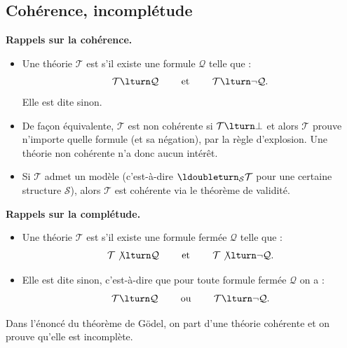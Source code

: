 \documentclass[11pt,class=report,crop=false]{standalone}
\begin{document}
\subsection{Cohérence, incomplétude}

\textbf{Rappels sur la cohérence.}

\begin{itemize}
    
    \item Une théorie $\mathcal{T}$ est  s'il existe une formule $\mathcal{Q}$ telle que :
\[
\mathcal{T} \lturn \mathcal{Q} \qquad \text{ et } \qquad \mathcal{T} \lturn \lnot \mathcal{Q}.
\]
Elle est dite  sinon.

    \item De façon équivalente, $\mathcal{T}$ est non cohérente si $\mathcal{T} \lturn \bot$ et alors $\mathcal{T}$ prouve n'importe quelle formule (et sa négation), par la règle d'explosion.
Une théorie non cohérente n'a donc aucun intérêt.

    \item Si $\mathcal{T}$ admet un modèle (c'est-à-dire $\ldoubleturn_\mathcal{S} \mathcal{T}$ pour une certaine structure $\mathcal{S}$), alors $\mathcal{T}$ est cohérente via le théorème de validité.
\end{itemize}

\bigskip

\textbf{Rappels sur la complétude.}

\begin{itemize}
    \item Une théorie $\mathcal{T}$ est  s'il existe une formule fermée $\mathcal{Q}$ telle que :
\[
\mathcal{T} \not\lturn \mathcal{Q} \qquad \text{ et } \qquad \mathcal{T} \not\lturn \lnot \mathcal{Q}.
\]

    \item Elle est dite  sinon, c'est-à-dire que pour toute formule fermée $\mathcal{Q}$ on a :
\[
\mathcal{T} \lturn \mathcal{Q} \qquad \text{ ou } \qquad \mathcal{T} \lturn \lnot \mathcal{Q}.
\]

\end{itemize}

Dans l'énoncé du théorème de Gödel, on part d'une théorie cohérente et on prouve qu'elle est incomplète.


\end{document}
